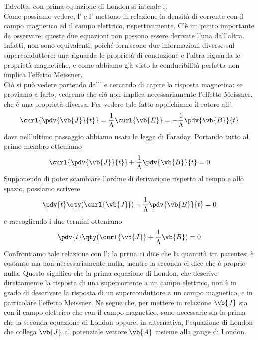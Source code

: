Talvolta, con prima equazione di London si intende l'.\\
Come possiamo vedere, l' e l' mettono in relazione la densità di corrente con il campo magnetico ed il campo elettrico, rispettivamente. C'è un punto importante da osservare: queste due equazioni non possono essere derivate l'una dall'altra. Infatti, non sono equivalenti, poiché forniscono due informazioni diverse sul superconduttore: una riguarda le proprietà di conduzione e l'altra riguarda le proprietà magnetiche, e come abbiamo già visto la conducibilità perfetta non implica l'effetto Meissner.\\
Ciò si può vedere partendo dall' e cercando di capire la risposta magnetica: se proviamo a farlo, vedremo che ciò non implica necessariamente l'effetto Meissner, che è una proprietà diversa. Per vedere tale fatto applichiamo il rotore all':
\begin{equation*}
   \curl{\pdv{\vb{J}}{t}}
   =\frac{1}{\Lambda} \curl{\vb{E}}
   =-\frac{1}{\Lambda} \pdv{\vb{B}}{t}
\end{equation*}
dove nell'ultimo passaggio abbiamo usato la legge di Faraday. Portando tutto al primo membro otteniamo
\begin{equation*}
   \curl{\pdv{\vb{J}}{t}} + \frac{1}{\Lambda} \pdv{\vb{B}}{t}=0
\end{equation*}
Supponendo di poter scambiare l'ordine di derivazione rispetto al tempo e allo spazio, possiamo scrivere
\begin{equation*}
   \pdv{t} \qty( \curl{\vb{J}} ) + \frac{1}{\Lambda} \pdv{\vb{B}}{t}=0
\end{equation*}
e raccogliendo i due termini otteniamo
\begin{equation*}
   \pdv{t} \qty( \curl{\vb{J}} + \frac{1}{\Lambda} \vb{B} )=0
\end{equation*}
Confrontiamo tale relazione con l': la prima ci dice che la quantità tra parentesi è costante ma non necessariamente nulla, mentre la seconda ci dice che è proprio nulla. Questo significa che la prima equazione di London, che descrive direttamente la risposta di una supercorrente a un campo elettrico, non è in grado di descrivere la risposta di un superconduttore a un campo magnetico, e in particolare l'effetto Meissner. Ne segue che, per mettere in relazione $\vb{J}$ sia con il campo elettrico che con il campo magnetico, sono necessarie sia la prima che la seconda equazione di London oppure, in alternativa, l'equazione di London che collega $\vb{J}$ al potenziale vettore $\vb{A}$ insieme alla gauge di London.\\
